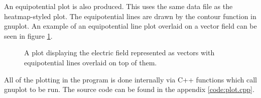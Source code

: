 \documentclass[12pt, a4paper]{article}
\begin{document}
An equipotential plot is also produced. This uses the same data file as the heatmap-styled plot. The equipotential lines are drawn by the contour function in gnuplot. An example of an equipotential line plot overlaid on a vector field can be seen in figure \ref{fig:vectors_and_contours}.

\begin{figure}[h!]
    \centering
    \setlength\fboxsep{0pt}
    \setlength\fboxrule{0.5pt}
    \caption{A plot displaying the electric field represented as vectors with equipotential lines overlaid on top of them.}
    \label{fig:vectors_and_contours}
\end{figure}

All of the plotting in the program is done internally via C++ functions which call gnuplot to be run. The source code can be found in the appendix \ref{code:plot.cpp}.
\end{document}
